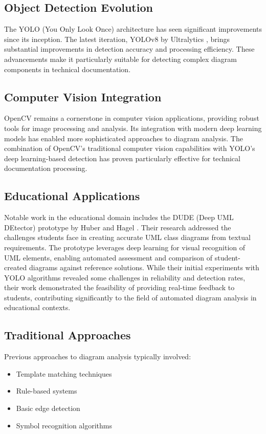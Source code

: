 \documentclass[conference]{IEEEtran}
\begin{document}
\subsection{Object Detection Evolution}
The YOLO (You Only Look Once) architecture has seen significant improvements since its inception. The latest iteration, YOLOv8 by Ultralytics \cite{b1}, brings substantial improvements in detection accuracy and processing efficiency. These advancements make it particularly suitable for detecting complex diagram components in technical documentation.

\subsection{Computer Vision Integration}
OpenCV \cite{b2} remains a cornerstone in computer vision applications, providing robust tools for image processing and analysis. Its integration with modern deep learning models has enabled more sophisticated approaches to diagram analysis. The combination of OpenCV's traditional computer vision capabilities with YOLO's deep learning-based detection has proven particularly effective for technical documentation processing.

\subsection{Educational Applications}
Notable work in the educational domain includes the DUDE (Deep UML DEtector) prototype by Huber and Hagel \cite{b6}. Their research addressed the challenges students face in creating accurate UML class diagrams from textual requirements. The prototype leverages deep learning for visual recognition of UML elements, enabling automated assessment and comparison of student-created diagrams against reference solutions. While their initial experiments with YOLO algorithms revealed some challenges in reliability and detection rates, their work demonstrated the feasibility of providing real-time feedback to students, contributing significantly to the field of automated diagram analysis in educational contexts.

\subsection{Traditional Approaches}
Previous approaches to diagram analysis typically involved:
\begin{itemize}
\item Template matching techniques
\item Rule-based systems
\item Basic edge detection
\item Symbol recognition algorithms
\end{itemize}
\end{document}
